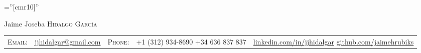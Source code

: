 \documentclass[a4paper,10pt]{article}
\begin{document}



\pagestyle{empty} %

\font\fb=''[cmr10]'' %

\par{\centering
		{\Huge Jaime Joseba \textsc{Hidalgo García}
	}\bigskip\par}



\begin{tabular}{p{1.0cm}p{4.0cm}p{1cm}p{3.8cm}p{1.2cm}}
    \textsc{Email:} & \href{mailto:jjhidalgar@gmail.com}{jjhidalgar@gmail.com} & 
    \textsc{Phone:\newline} & +1 (312) 934-8690 \newline +34 636 837 837  &
    \href{https://www.linkedin.com/in/jjhidalgar/}{linkedin.com/in/jjhidalgar} \newline \href{https://github.com/jaimehrubiks}{github.com/jaimehrubiks}
\end{tabular}

\end{document}
